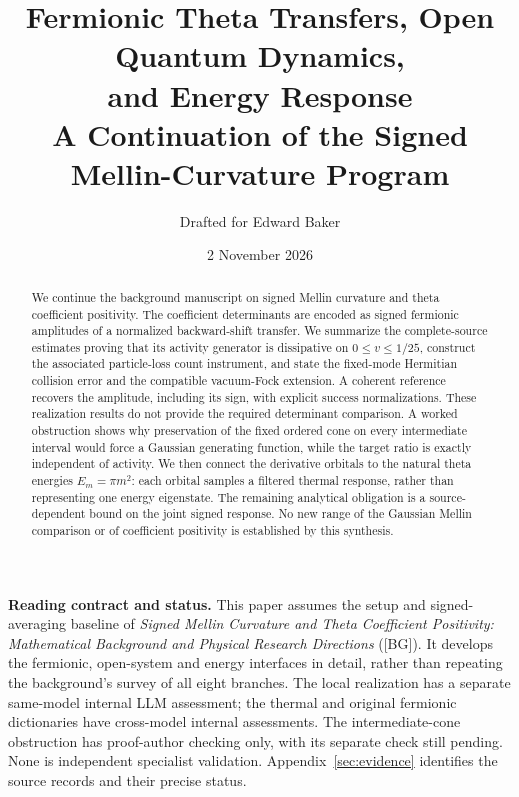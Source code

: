 \documentclass[11pt,letterpaper]{article}
\title{Fermionic Theta Transfers, Open Quantum Dynamics,\\and Energy Response\\[6pt]
\large A Continuation of the Signed Mellin-Curvature Program}
\author{Drafted for Edward Baker}
\date{2 November 2026}
\numberwithin{equation}{section}
\theoremstyle{remark}
\newcommand{\ev}[1]{\textsf{[#1]}}
\begin{document}
\maketitle
\begin{abstract}
We continue the background manuscript on signed Mellin curvature and theta
coefficient positivity. The coefficient determinants are encoded as signed
fermionic amplitudes of a normalized backward-shift transfer. We summarize
the complete-source estimates proving that its activity generator is
dissipative on $0\le v\le1/25$, construct the associated particle-loss
count instrument, and state the fixed-mode Hermitian collision error and
the compatible vacuum-Fock extension. A coherent reference recovers the
amplitude, including its sign, with explicit success normalizations.
These realization results do not provide the required determinant
comparison. A worked obstruction shows why preservation of the fixed
ordered cone on every intermediate interval would force a Gaussian
generating function, while the target ratio is exactly independent of
activity. We then connect the derivative orbitals to the natural theta
energies $E_m=\pi m^2$: each orbital samples a filtered thermal response,
rather than representing one energy eigenstate. The remaining analytical
obligation is a source-dependent bound on the joint signed response. No
new range of the Gaussian Mellin comparison or of coefficient positivity
is established by this synthesis.
\end{abstract}

\noindent\textbf{Reading contract and status.}
This paper assumes the setup and signed-averaging baseline of
\emph{Signed Mellin Curvature and Theta Coefficient Positivity:
Mathematical Background and Physical Research Directions} (\ev{BG}).
It develops the fermionic, open-system and energy interfaces in detail,
rather than repeating the background's survey of all eight branches.
The local realization has a separate same-model internal LLM assessment;
the thermal and original fermionic dictionaries have cross-model internal
assessments. The intermediate-cone obstruction has proof-author checking
only, with its separate check still pending. None is independent
specialist validation. Appendix~\ref{sec:evidence} identifies the source
records and their precise status.

\clearpage
\tableofcontents
\clearpage
\end{document}
